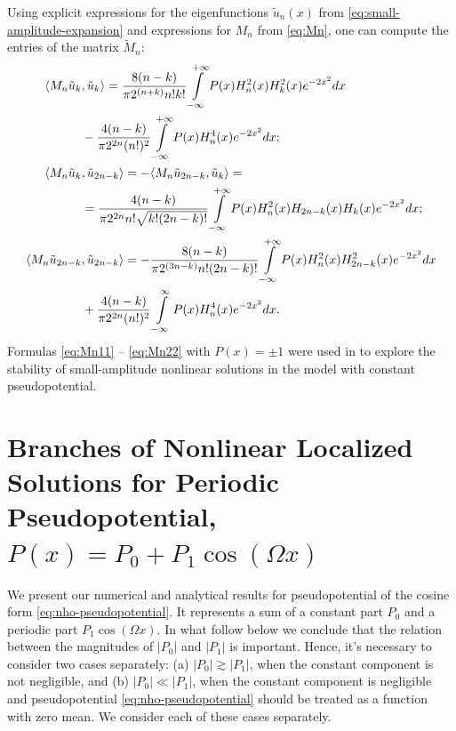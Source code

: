 Using explicit expressions for the eigenfunctions $\tilde{u}_n(x)$ from \eqref{eq:small-amplitude-expansion} and expressions for $M_n$ from \eqref{eq:Mn}, one can compute the entries of the matrix $\widetilde{M}_n$:
\begin{align}
\langle M_n \tilde{u}_k &, \tilde{u}_k \rangle = \frac{8(n-k)}{\pi 2^{(n+k)} n! k!} \int \limits_{-\infty }^{+\infty} P(x) H_n^2(x) H_k^2(x) e^{-2 x^2} dx \notag \\ & - \frac{4(n-k)}{\pi 2^{2n}(n!)^2} \int \limits_{-\infty }^{+\infty} P(x) H_n^4(x) e^{-2 x^2} dx; \label{eq:Mn11} \\
\langle M_n \tilde{u}_k &, \tilde{u}_{2n-k} \rangle = -\langle M_n \tilde{u}_{2n-k}, \tilde{u}_k \rangle = \notag \\ & = \frac{4 (n-k)}{\pi 2^{2n} n! \sqrt{k! (2n-k)!}} \int \limits_{-\infty}^{+\infty} P(x) H_n^2(x) H_{2n-k}(x) H_k(x) e^{-2 x^2} dx;  \label{eq:Mn12} \\
\langle M_n \tilde{u}_{2n-k} &, \tilde{u}_{2n-k} \rangle = -\frac{8(n-k)}{\pi 2^{(3n-k)} n! (2n-k)!} \int \limits_{-\infty}^{+\infty} P(x) H_n^2(x) H_{2n-k}^2(x) e^{-2 x^2} dx \notag \\ & + \frac{4(n-k)}{\pi 2^{2n} (n!)^2} \int \limits_{-\infty}^{\infty} P(x) H_n^4(x) e^{-2 x^2} dx. \label{eq:Mn22}
\end{align}
Formulas \eqref{eq:Mn11} -- \eqref{eq:Mn22} with $P(x) = \pm 1$ were used in \cite{ZezyulinAlfimovKonotopPerecGarcia2008} to explore the stability of small-amplitude nonlinear solutions in the model with constant pseudopotential.

\section{Branches of Nonlinear Localized Solutions for Periodic Pseudopotential, $P(x) = P_0 + P_1 \cos (\Omega x)$}

We present our numerical and analytical results for pseudopotential of the cosine form \eqref{eq:nho-pseudopotential}.
It represents a sum of a constant part $P_0$ and a periodic part $P_1 \cos (\Omega x)$.
In what follow below we conclude that the relation between the magnitudes of $|P_0|$ and $|P_1|$ is important.
Hence, it's necessary to consider two cases separately: (a) $|P_0| \gtrsim |P_1|$, when the constant component is not negligible, and (b) $|P_0| \ll |P_1|$, when the constant component is negligible and pseudopotential \eqref{eq:nho-pseudopotential} should be treated as a function with zero mean. 
We consider each of these cases separately.

